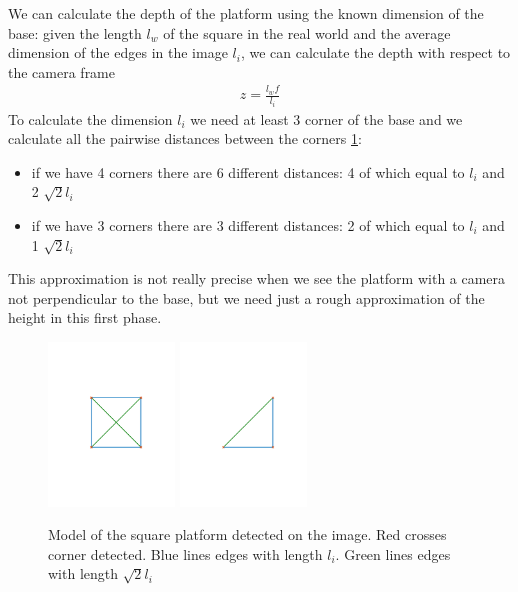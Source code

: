 We can calculate the depth of the platform using the known dimension of the base: given the length $l_w$ of the square in the real world and the average dimension of the edges in the image $l_i$, we can calculate the depth with respect to the camera frame 
\begin{align}
z = \frac{l_w f}{l_i}
\end{align}
To calculate the dimension $l_i$ we need at least 3 corner of the base and we calculate all the pairwise distances between the corners \ref{fig:platform_profile}:
\begin{itemize}
\item if we have 4 corners there are 6 different distances: 4 of which equal to $l_i$ and 2 $\sqrt{2}l_i$
\item if we have 3 corners there are 3 different distances: 2 of which equal to $l_i$ and 1 $\sqrt{2}l_i$
\end{itemize}
This approximation is not really precise when we see the platform with a camera not perpendicular to the base, but we need just a rough approximation of the height in this first phase.
\begin{figure}[!htbp]
  \centering
  {\includegraphics[width=0.3\textwidth]{img/platform_4_edges.pdf}\label{fig:4_corners}}
  \hspace{5em}
  {\includegraphics[width=0.3\textwidth]{img/platform_3_edges.pdf}\label{fig:3_corners}}
  \caption{Model of the square platform detected on the image. Red crosses corner detected. Blue lines edges with length $l_i$. Green lines edges with length $\sqrt{2}l_i$ }
  \label{fig:platform_profile}
\end{figure} 

